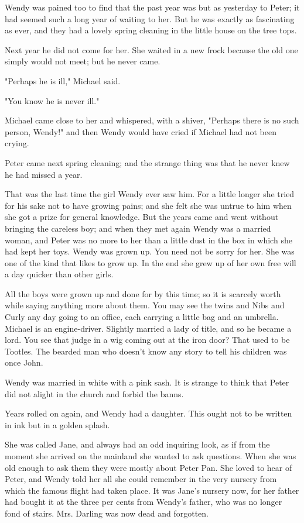 Wendy was pained too to find that the past year was but as yesterday to
Peter; it had seemed such a long year of waiting to her. But he was
exactly as fascinating as ever, and they had a lovely spring cleaning in
the little house on the tree tops.


Next year he did not come for her. She waited in a new frock because the
old one simply would not meet; but he never came.


"Perhaps he is ill," Michael said.


"You know he is never ill."


Michael came close to her and whispered, with a shiver, "Perhaps there is
no such person, Wendy!" and then Wendy would have cried if Michael had not
been crying.


Peter came next spring cleaning; and the strange thing was that he never
knew he had missed a year.


That was the last time the girl Wendy ever saw him. For a little longer
she tried for his sake not to have growing pains; and she felt she was
untrue to him when she got a prize for general knowledge. But the years
came and went without bringing the careless boy; and when they met again
Wendy was a married woman, and Peter was no more to her than a little dust
in the box in which she had kept her toys. Wendy was grown up. You need
not be sorry for her. She was one of the kind that likes to grow up. In
the end she grew up of her own free will a day quicker than other girls.


All the boys were grown up and done for by this time; so it is scarcely
worth while saying anything more about them. You may see the twins and
Nibs and Curly any day going to an office, each carrying a little bag and
an umbrella. Michael is an engine-driver. Slightly
married a lady of title, and so he became a lord. You see that judge in a
wig coming out at the iron door? That used to be Tootles. The bearded man
who doesn't know any story to tell his children was once John.


Wendy was married in white with a pink sash. It is strange to think that
Peter did not alight in the church and forbid the banns.


Years rolled on again, and Wendy had a daughter. This ought not to be
written in ink but in a golden splash.


She was called Jane, and always had an odd inquiring look, as if from the
moment she arrived on the mainland she wanted to ask questions. When she
was old enough to ask them they were mostly about Peter Pan. She loved to
hear of Peter, and Wendy told her all she could remember in the very
nursery from which the famous flight had taken place. It was Jane's
nursery now, for her father had bought it at the three per cents
from Wendy's father, who was no longer fond of stairs. Mrs. Darling
was now dead and forgotten.


